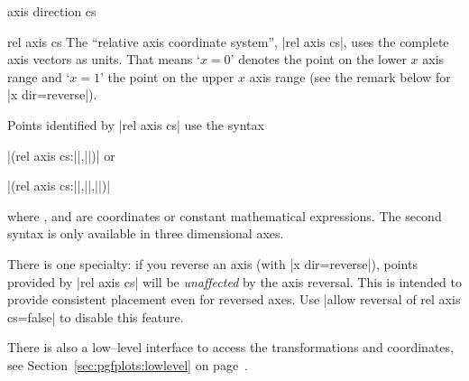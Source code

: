 \begin{coordinatesystem}{axis direction cs}
\end{coordinatesystem}


\begin{coordinatesystem}{rel axis cs}
The ``relative axis coordinate system'', |rel axis cs|, uses the complete axis vectors as units. That means `$x=0$' denotes the point on the lower $x$ axis range and `$x=1$' the point on the upper $x$ axis range (see the remark below for |x dir=reverse|).

\pgfplotsexpensiveexample
\begin{codeexample}[]
\end{codeexample}

\pgfplotsexpensiveexample
\begin{codeexample}[]
\end{codeexample}

	Points identified by |rel axis cs| use the syntax

		|(rel axis cs:||,||)| or

		|(rel axis cs:||,||,||)| 
	
	\noindent where ,  and  are coordinates or constant mathematical expressions. The second syntax is only available in three dimensional axes.

	There is one specialty: if you reverse an axis (with |x dir=reverse|), points provided by |rel axis cs| will be \emph{unaffected} by the axis reversal. This is intended to provide consistent placement even for reversed axes. Use |allow reversal of rel axis cs=false| to disable this feature.

There is also a low--level interface to access the transformations and coordinates, see Section~\ref{sec:pgfplots:lowlevel} on page~\pageref{sec:pgfplots:lowlevel}.
\end{coordinatesystem}

